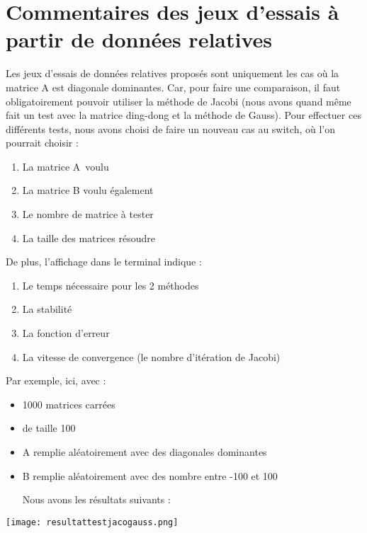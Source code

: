 \documentclass[letter]{article}
\begin{document}
\section{Commentaires des jeux d'essais à partir de données relatives}
\label{sec:orgd092751}


Les jeux d'essais de données relatives proposés sont uniquement les cas où la matrice A est diagonale dominantes. Car, pour faire une comparaison, il faut obligatoirement pouvoir utiliser la méthode de Jacobi (nous avons quand même fait un test avec la matrice ding-dong et la méthode de Gauss).
Pour effectuer ces différents tests, nous avons choisi de faire un nouveau cas au switch, où l'on pourrait choisir :

\begin{enumerate}
\item La matrice A voulu
\item La matrice B voulu également
\item Le nombre de matrice à tester
\item La taille des matrices résoudre
\end{enumerate}





De plus, l'affichage dans le terminal indique :
\begin{enumerate}
\item Le temps nécessaire pour les 2 méthodes
\item La stabilité
\item La fonction d'erreur
\item La vitesse de convergence (le nombre d'itération de Jacobi)
\end{enumerate}



Par exemple, ici, avec :
\begin{itemize}
\item 1000 matrices carrées
\item de taille 100
\item A remplie aléatoirement avec des diagonales dominantes
\item B remplie aléatoirement avec des nombre entre -100 et 100

Nous avons les résultats suivants :
\end{itemize}


\begin{center}
\texttt{[image: resultattestjacogauss.png]}
\end{center}
\end{document}
